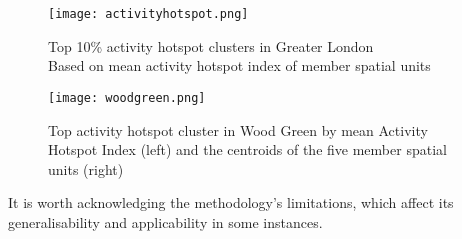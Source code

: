 \begin{figure}
    \centering
    \texttt{[image: activityhotspot.png]}
    \captionsetup{justification=centering}
    \caption{Top 10\% activity hotspot clusters in Greater London\\Based on mean activity hotspot index of member spatial units}
    \label{fig:activityhotpost}
\end{figure}

\begin{figure}[!hbt]
    \centering
    \texttt{[image: woodgreen.png]}
    \captionsetup{justification=centering}
    \caption{Top activity hotspot cluster in Wood Green by mean Activity Hotspot Index (left) and the centroids of the five member spatial units (right)}
    \label{fig:woodgreen}
\end{figure}

\pagebreak
It is worth acknowledging the methodology's limitations, which affect its generalisability and applicability in some instances.

